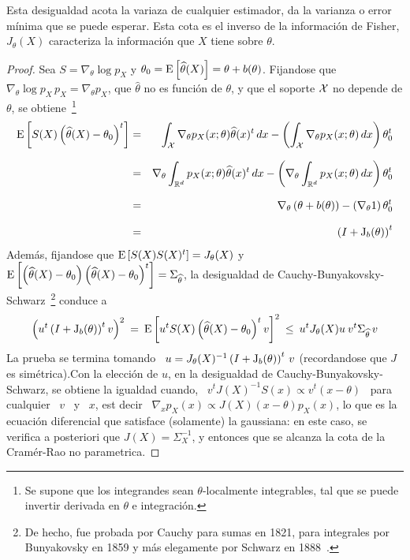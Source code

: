%
\noindent Esta  desigualdad acota la variaza  de cualquier estimador,  \ie da la
varianza o error  m\'inima que se puede  esperar. Esta cota es el  inverso de la
informaci\'on de Fisher, \ie  $J_\theta(X)$ caracteriza la informaci\'on que $X$
tiene sobre $\theta$.
%
\begin{proof}
  Sea $S = \nabla_\theta \log  p_X$ y $\theta_0 = \operatorname{E}\left[ \widehat{\theta}(X)
  \right] = \theta + b(\theta)$. Fijandose  que $\nabla_\theta \log p_X \, p_X =
  \nabla_\theta p_X$, que $\widehat{\theta}$ no  es funci\'on de $\theta$, y que
  el soporte $\mathcal{X}$ no depende de $\theta$, se obtiene~\footnote{Se supone que los
    integrandes sean $\theta$-localmente integrables,  tal que se puede invertir
    derivada en $\theta$ e integraci\'on.}
  \begin{eqnarray*}
  \operatorname{E}\left[ S(X) \left( \widehat{\theta}(X) - \theta_0 \right)^t \right] & = &
  \int_{\mathcal{X}} \nabla_\theta p_X(x;\theta) \widehat{\theta}(x)^t \, dx - \left(
  \int_{\mathcal{X}} \nabla_\theta p_X(x;\theta) \, dx \right) \theta_0^t\\[2.5mm]
  & = & \nabla_\theta \int_{\mathbb{R}^d} p_X(x;\theta) \widehat{\theta}(x)^t \, dx -
  \left( \nabla_\theta \int_{\mathbb{R}^d} p_X(x;\theta) \, dx \right)
  \theta_0^t\\[2.5mm]
  & = & \nabla_\theta \left( \theta + b(\theta) \right)  - 
  \left( \nabla_\theta 1 \right) \theta_0^t\\[2.5mm]
  & = & \left( I + \operatorname{J}_b(\theta) \right)^t
  \end{eqnarray*}
  Adem\'as,  fijandose  que  $\operatorname{E}\left[  S(X)  S(X)^t \right]  =  J_\theta(X)$  y
  $\operatorname{E}\left[   \left(    \widehat{\theta}(X)   -   \theta_0    \right)   \left(
      \widehat{\theta}(X)      -      \theta_0      \right)^t     \right]      =
  \Sigma_{\widehat{\theta}}$,            la            desigualdad            de
  Cauchy-Bunyakovsky-Schwarz~\footnote{De  hecho, fue  probada  por Cauchy  para
    sumas en 1821, para integrales por  Bunyakovsky en 1859 y m\'as elegamente por
    Schwarz  en  1888~\cite{Ste04}.}   conduce  a
  \[
  \left( u^t \left( I + \operatorname{J}_b(\theta)  \right)^t v \right)^2 \: = \: \operatorname{E}\left[
    u^t S(X) \left( \widehat{\theta}(X) -  \theta_0 \right)^t v \right]^2 \: \le
  \: u^t J_\theta(X) u \: v^t \Sigma_{\widehat{\theta}} \, v
  \]
  La prueba se termina tomando \ $u = J_\theta(X)^{-1} \left( I + \operatorname{J}_b(\theta)
  \right)^t \, v$ (recordandose que $J$ es sim\'etrica).\newline Con la elecci\'on
  de  $u$,  en  la  desigualdad  de Cauchy-Bunyakovsky-Schwarz,  se  obtiene  la
  igualdad  cuando, \  $v^t J(X)^{-1}  S(x)  \propto v^t  (x -  \theta)$ \  para
  cualquier \  $v$ \ y \  $x$, est decir \  $\nabla_x p_X (x) \propto  J(X) (x -
  \theta) p_X(x)$, lo que es la ecuaci\'on diferencial que satisface (solamente)
  la  gaussiana:   en  este  caso,  se   verifica  a  posteriori   que  $J(X)  =
  \Sigma_X^{-1}$,  y entonces  que  se alcanza  la  cota de  la Cram\'er-Rao  no
  parametrica.
\end{proof}
